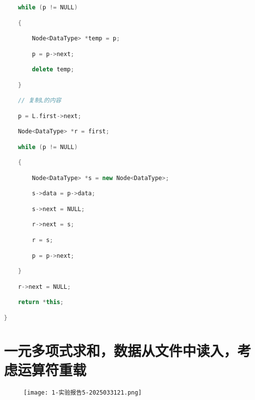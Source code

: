 \begin{lstlisting}[language=C++]
    while (p != NULL)

    {

        Node<DataType> *temp = p;

        p = p->next;

        delete temp;

    }

    // 复制L的内容

    p = L.first->next;

    Node<DataType> *r = first;

    while (p != NULL)

    {

        Node<DataType> *s = new Node<DataType>;

        s->data = p->data;

        s->next = NULL;

        r->next = s;

        r = s;

        p = p->next;

    }

    r->next = NULL;

    return *this;

}
\end{lstlisting}
\section{一元多项式求和，数据从文件中读入，考虑运算符重载}

\begin{figure}[H]
\centering
\texttt{[image: 1-实验报告5-2025033121.png]}
\label{}
\end{figure}

